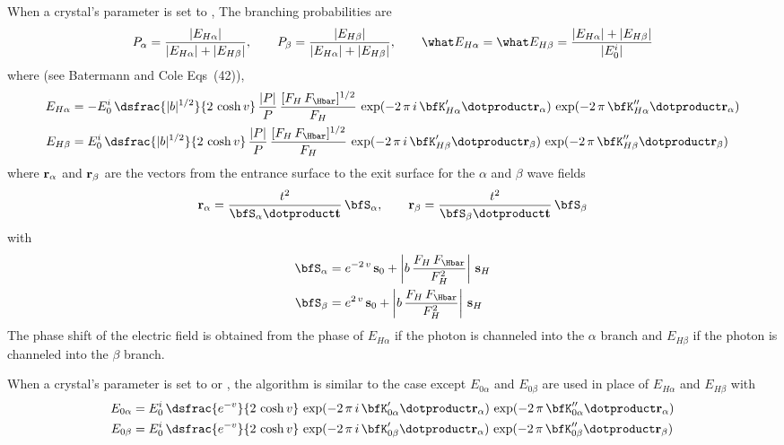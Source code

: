 When a crystal's  parameter is set to , The branching
probabilities are
\begin{equation}
  P_\alpha = \frac{|E_{H\alpha}|}{|E_{H\alpha}| + |E_{H\beta}|} , \qquad
  P_\beta = \frac{|E_{H\beta}|}{|E_{H\alpha}| + |E_{H\beta}|} , \qquad
  \what E_{H\alpha} = \what E_{H\beta}  = \frac{|E_{H\alpha}| + |E_{H\beta}|}{|E_0^i|}
\end{equation}
where (see Batermann and Cole\cite{b:batterman} Eqs~(42)), 
\begin{align}
  E_{H\alpha} &= -E_0^i \, \dsfrac{|b|^{1/2}}{2 \, \cosh v} \, 
    \frac{|P|}{P} \, 
    \frac{[F_H \, F_\Hbar]^{1/2}}{F_H} \, 
    \exp({-2 \, \pi \, i \, \bfK'_{H\alpha} \dotproduct \bfr_\alpha}) \,
    \exp({-2 \, \pi \, \bfK''_{H\alpha} \dotproduct \bfr_\alpha}) \CRNO
  E_{H\beta} &= E_0^i \, \dsfrac{|b|^{1/2}}{2 \, \cosh v} \, 
    \frac{|P|}{P} \, 
    \frac{[F_H \, F_\Hbar]^{1/2}}{F_H} \, 
    \exp({-2 \, \pi \, i \, \bfK'_{H\beta} \dotproduct \bfr_\beta}) \,
    \exp({-2 \, \pi \, \bfK''_{H\beta} \dotproduct \bfr_\beta})
\end{align}
where ${\bf r}_\alpha$ and ${\bf r}_\beta$ are the vectors from the entrance surface to the exit surface
for the $\alpha$ and $\beta$ wave fields
\begin{equation}
  \bfr_\alpha = \frac{t^2}{\bfS_\alpha \dotproduct \Bf t} \, \bfS_\alpha , \qquad
  \bfr_\beta = \frac{t^2}{\bfS_\beta \dotproduct \Bf t} \, \bfS_\beta
\end{equation}
with
\begin{align}
  \bfS_\alpha &= e^{-2 \, v} \, \Bf s_0 + \left| b \, \frac{F_H \, F_\Hbar}{F_H^2} \right| \, \Bf s_H \CRNO
  \bfS_\beta &= e^{2 \, v} \, \Bf s_0 + \left| b \, \frac{F_H \, F_\Hbar}{F_H^2} \right| \, \Bf s_H 
\end{align}
The phase shift of the electric field is obtained from the phase of $E_{H\alpha}$ if the photon is
channeled into the $\alpha$ branch and $E_{H\beta}$ if the photon is channeled into the $\beta$
branch.

When a crystal's  parameter is set to  or
, the algorithm is similar to the  case except $E_{0\alpha}$
and $E_{0\beta}$ are used in place of $E_{H\alpha}$ and $E_{H\beta}$ with
\begin{align}
  E_{0\alpha} &= E_0^i \, \dsfrac{e^{-v}}{2 \, \cosh v} \, 
    \exp({-2 \, \pi \, i \, \bfK'_{0\alpha} \dotproduct \bfr_\alpha}) \,
    \exp({-2 \, \pi \, \bfK''_{0\alpha} \dotproduct \bfr_\alpha}) \CRNO
  E_{0\beta} &= E_0^i \, \dsfrac{e^{-v}}{2 \, \cosh v} \, 
    \exp({-2 \, \pi \, i \, \bfK'_{0\beta} \dotproduct \bfr_\alpha}) \,
    \exp({-2 \, \pi \, \bfK''_{0\beta} \dotproduct \bfr_\beta})
\end{align}


